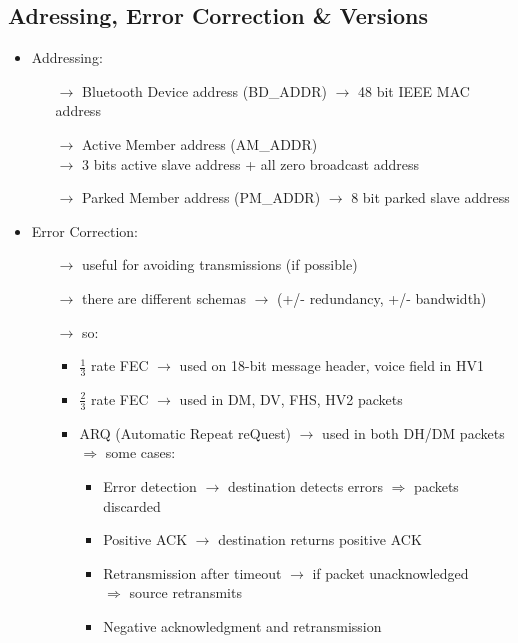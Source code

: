 \subsection{Adressing, Error Correction \& Versions}
\begin{itemize}
    \item Addressing:
    \begin{itemize}
        \item[$\rightarrow$] Bluetooth Device address (BD\_ADDR) $\rightarrow$ 48 bit IEEE MAC address
        \item[$\rightarrow$] Active Member address (AM\_ADDR)\\$\rightarrow$ 3 bits active slave address + all zero broadcast address
        \item[$\rightarrow$] Parked Member address (PM\_ADDR) $\rightarrow$ 8 bit parked slave address
    \end{itemize}
    \item Error Correction:
    \begin{itemize}
        \item[$\rightarrow$] useful for avoiding transmissions (if possible)
        \item[$\rightarrow$] there are different schemas $\rightarrow$ (+/- redundancy, +/- bandwidth)
        \item[$\rightarrow$] so:
        \begin{itemize}
            \item $\frac{1}{3}$ rate FEC\footFEC
            $\rightarrow$ used on 18-bit message header, voice field in HV1
            \item $\frac{2}{3}$ rate FEC $\rightarrow$ used in DM, DV, FHS, HV2 packets
            \item ARQ (Automatic Repeat reQuest) $\rightarrow$ used in both DH/DM packets\\
            $\Rightarrow$ some cases:
            \begin{itemize}
                \item Error detection $\rightarrow$ destination detects errors $\Rightarrow$ packets discarded
                \item Positive ACK $\rightarrow$ destination returns positive ACK
                \item Retransmission after timeout $\rightarrow$ if packet unacknowledged\\
                $\Rightarrow$ source retransmits
                \item Negative acknowledgment and retransmission\\

\end{itemize}
\end{itemize}
\end{itemize}
\end{itemize}
